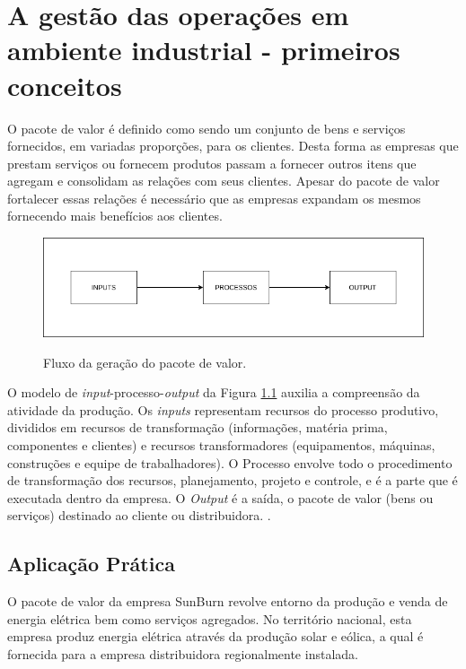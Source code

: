 \chapter{A gestão das operações em ambiente industrial - primeiros conceitos}
\label{chap:gestao_operacoes}

O pacote de valor é definido como sendo um conjunto de bens e serviços fornecidos, em variadas proporções, para os clientes. Desta forma as empresas que prestam serviços ou fornecem produtos passam a fornecer outros itens que agregam e consolidam as relações com seus clientes.
Apesar do pacote de valor fortalecer essas relações é necessário que as empresas expandam os mesmos fornecendo mais benefícios aos clientes.

\begin{figure}[H]
    \caption{Fluxo da geração do pacote de valor.}
    \includegraphics[width=\textwidth]{images/pacote_valor.png}
    \label{fig:pacotevalor}

\end{figure}

O modelo de \textit{input}-processo-\textit{output} da Figura \ref{fig:pacotevalor} auxilia a compreensão da atividade da produção. Os \textit{inputs} representam recursos do processo produtivo, divididos em recursos de transformação (informações, matéria prima, componentes e clientes) e recursos transformadores (equipamentos, máquinas, construções e equipe de trabalhadores). O Processo envolve todo o procedimento de transformação dos recursos, planejamento, projeto e controle, e é a parte que é executada dentro da empresa. O \textit{Output} é a saída, o pacote de valor (bens ou serviços) destinado ao cliente ou distribuidora. \cite{slack2006administracao}.

\section{Aplicação Prática}
\label{sec:gestao_operacoes_aplicacao}
O pacote de valor da empresa SunBurn revolve entorno da produção e venda de energia elétrica bem como serviços agregados. No território nacional, esta empresa produz energia elétrica através da produção solar e eólica, a qual é fornecida para a empresa distribuidora regionalmente instalada.

